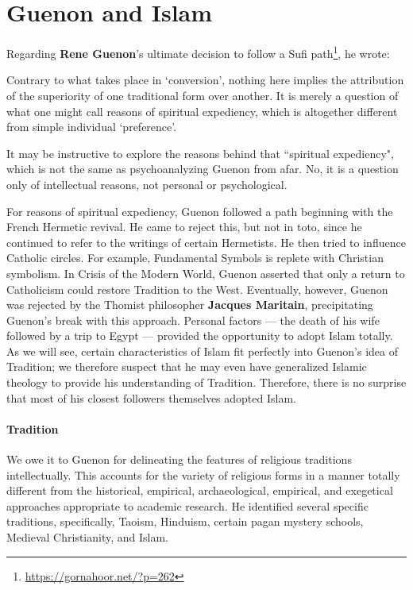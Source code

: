 \section{Guenon and Islam}

Regarding \textbf{Rene Guenon}'s ultimate decision to follow a Sufi path\footnote{\url{https://gornahoor.net/?p=262}}, he wrote:

\begin{quotex}
Contrary to what takes place in `conversion', nothing here implies the attribution of the superiority of one traditional form over another. It is merely a question of what one might call reasons of spiritual expediency, which is altogether different from simple individual `preference'. 

\end{quotex}
It may be instructive to explore the reasons behind that ``spiritual expediency", which is not the same as psychoanalyzing Guenon from afar. No, it is a question only of intellectual reasons, not personal or psychological.

For reasons of spiritual expediency, Guenon followed a path beginning with the French Hermetic revival. He came to reject this, but not in toto, since he continued to refer to the writings of certain Hermetists. He then tried to influence Catholic circles. For example, Fundamental Symbols is replete with Christian symbolism. In Crisis of the Modern World, Guenon asserted that only a return to Catholicism could restore Tradition to the West. Eventually, however, Guenon was rejected by the Thomist philosopher \textbf{Jacques Maritain}, precipitating Guenon's break with this approach. Personal factors — the death of his wife followed by a trip to Egypt — provided the opportunity to adopt Islam totally. As we will see, certain characteristics of Islam fit perfectly into Guenon's idea of Tradition; we therefore suspect that he may even have generalized Islamic theology to provide his understanding of Tradition. Therefore, there is no surprise that most of his closest followers themselves adopted Islam.

\paragraph{Tradition}
We owe it to Guenon for delineating the features of religious traditions intellectually. This accounts for the variety of religious forms in a manner totally different from the historical, empirical, archaeological, empirical, and exegetical approaches appropriate to academic research. He identified several specific traditions, specifically, Taoism, Hinduism, certain pagan mystery schools, Medieval Christianity, and Islam.

